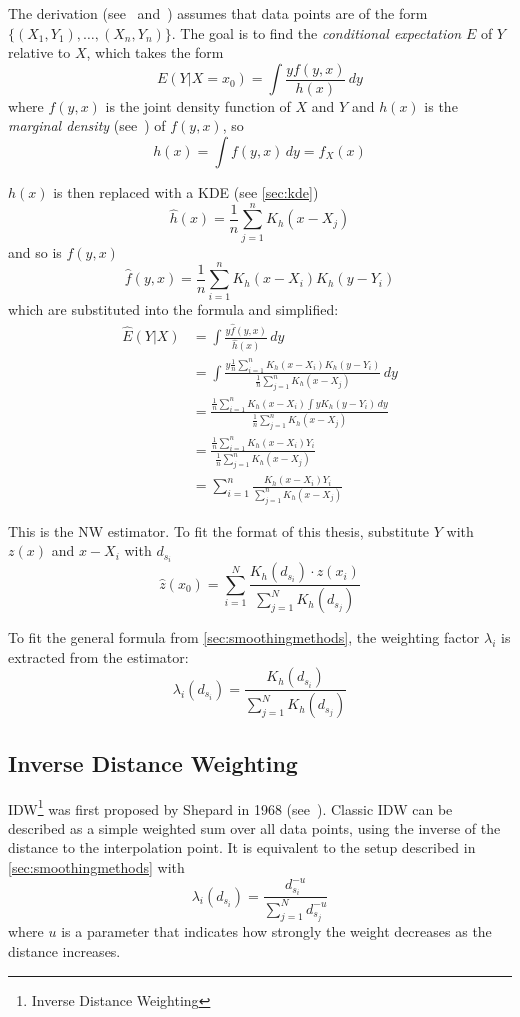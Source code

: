 The derivation (see\ \cite{nw:book} and\ \cite{nw:web01}) assumes that data points are of the form $\{(X_1,Y_1), \dots,(X_n,Y_n)\}$. The goal is to find the \emph{conditional expectation} $E$ of $Y$ relative to $X$, which takes the form
\[
E(Y|X=x_0)=\int \frac{yf(y,x)}{h(x)}\,dy
\]
where $f(y,x)$ is the joint density function of $X$ and $Y$ and  $h(x)$ is the \emph{marginal density} (see\ \cite{nw:mdense}) of $f(y,x)$, so
\[
h(x)=\int f(y,x)\,dy=f_X(x)
\]

$h(x)$ is then replaced with a KDE (see \autoref{sec:kde})
\[
\hat{h}(x)=\frac{1}{n}\sum_{j=1}^n K_h(x-X_j)
\]
and so is $f(y,x)$
\[
\hat{f}(y,x)=\frac{1}{n}\sum_{i=1}^n K_h(x-X_i) K_h(y-Y_i)
\]
which are substituted into the formula and simplified:
\begin{align*}
    \hat{E}(Y|X) &= \int \frac{y\hat{f}(y,x)}{\hat{h}(x)}\,dy\\
    &=\int \frac{y \frac{1}{n}\sum_{i=1}^n K_h\left(x-X_i\right) K_h\left(y-Y_i\right)}{\frac{1}{n}\sum_{j=1}^n K_h\left(x-X_j\right)}\,dy\\
    &=\frac{\frac{1}{n}\sum_{i=1}^n K_h\left(x-X_i\right)\int y K_h\left(y-Y_i\right)\,dy}{\frac{1}{n}\sum_{j=1}^n K_h\left(x-X_j\right)}\\
    &=\frac{\frac{1}{n}\sum_{i=1}^n K_h\left(x-X_i\right)Y_i}{\frac{1}{n}\sum_{j=1}^n K_h\left(x-X_j\right)}\\
    &=\sum_{i=1}^n \frac{K_h\left(x-X_i\right)Y_i}{\sum_{j=1}^n K_h\left(x-X_j\right)}
\end{align*}
\vspace{1.5em}

This is the NW estimator. To fit the format of this thesis, substitute $Y$ with $z(x)$ and $x - X_i$ with $d_{s_i}$
\[
\hat{z}(x_0)=\sum_{i=1}^N \frac{K_h\left(d_{s_i}\right)\cdot z\left(x_i\right)}{\sum_{j=1}^N K_h\left(d_{s_j}\right)}
\]

To fit the general formula from \autoref{sec:smoothingmethods}, the weighting factor $\lambda_i$ is extracted from the estimator:
\[
\lambda_i(d_{s_i})=\frac{K_h\left(d_{s_i}\right)}{\sum_{j=1}^N K_h\left(d_{s_j}\right)}
\]

\subsection{Inverse Distance Weighting}\label{subsec:idw}

IDW\footnote{Inverse Distance Weighting} was first proposed by Shepard in 1968 (see\ \cite{idw:paper01}). Classic IDW can be described as a simple weighted sum over all data points, using the inverse of the distance to the interpolation point. It is equivalent to the setup described in \autoref{sec:smoothingmethods} with
\[
\lambda_i(d_{s_i})=\frac{d_{s_i}^{-u}}{\sum_{j=1}^N d_{s_j}^{-u}}
\]  
where $u$ is a parameter that indicates how strongly the weight decreases as the distance increases.


